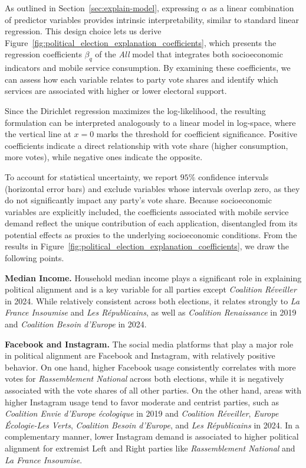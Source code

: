 \documentclass[9pt,sigconf,letterpaper]{acmart}
\newcommand{\RN}{\textsl{Rassemblement National}\xspace}
\newcommand{\LR}{\textsl{Les Républicains}\xspace}
\newcommand{\RENA}{\textsl{Coalition Renaissance}\xspace}
\newcommand{\BESO}{\textsl{Coalition Besoin d'Europe}\xspace}
\newcommand{\EEC}{\textsl{Europe Écologie-Les Verts}\xspace}
\newcommand{\LFI}{\textsl{La France Insoumise}\xspace}
\newcommand{\ENVI}{\textsl{Coalition Envie d'Europe écologique}\xspace}
\newcommand{\REVE}{\textsl{Coalition Réveiller}\xspace}
\newcommand{\all}{\emph{All}\xspace}
\begin{document}
As outlined in Section~\ref{sec:explain-model}, expressing $\alpha$ as a linear combination of predictor variables provides intrinsic interpretability, similar to standard linear regression.
This design choice lets us derive Figure~\ref{fig:political_election_explanation_coefficients}, which presents the regression coefficients $\beta_q$ of the \all model that integrates both socioeconomic indicators and mobile service consumption.
By examining these coefficients, we can assess how each variable relates to party vote shares and identify which services are associated with higher or lower electoral support.

Since the Dirichlet regression maximizes the log-likelihood, the resulting formulation can be interpreted analogously to a linear model in log-space, where the vertical line at $x=0$ marks the threshold for coefficient significance.
Positive coefficients indicate a direct relationship with vote share (higher consumption, more votes), while negative ones indicate the opposite.

To account for statistical uncertainty, we report $95\%$ confidence intervals (horizontal error bars) and exclude variables whose intervals overlap zero, as they do not significantly impact any party’s vote share.
Because socioeconomic variables are explicitly included, the coefficients associated with mobile service demand reflect the unique contribution of each application, disentangled from its potential effects as proxies to the underlying socioeconomic conditions.
From the results in Figure~\ref{fig:political_election_explanation_coefficients}, we draw the following points.

\noindent\textbf{Median Income.} 
Household median income plays a significant role in explaining political alignment and is a key variable for all parties except \REVE in 2024.
While relatively consistent across both elections, it relates strongly to \LFI and \LR, as well as \RENA in 2019 and \BESO in 2024.

\noindent\textbf{Facebook and Instagram.} 
The social media platforms that play a major role in political alignment are Facebook and Instagram, with relatively positive behavior.
On one hand, higher Facebook usage consistently correlates with more votes for \RN across both elections, while it is negatively associated with the vote shares of all other parties. 
On the other hand, areas with higher Instagram usage tend to favor moderate and centrist parties, such as \ENVI in 2019 and \REVE, \EEC, \BESO, and \LR in 2024.
In a complementary manner, lower Instagram demand is associated to higher political alignment for extremist Left and Right parties like \RN and \LFI.
\end{document}
